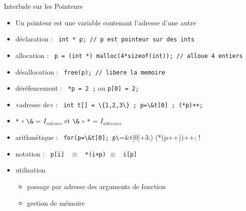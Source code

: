 \documentclass[11pt,mathserif]{beamer}
\newcommand{\scout}{\faAngellist}
\newcommand{\argi}{\faLightbulbO}
\newif\ifC
\begin{document}
\ifC
\begin{frame}{Interlude sur les Pointeurs}
\begin{itemize}[<+->]
  \item Un pointeur est une variable contenant l'adresse d'une autre
  \item déclaration : \lstinline! int * p; // p est pointeur sur des ints !
  \item allocation  : \lstinline! p = (int *) malloc(4*sizeof(int)); // alloue 4 entiers !
  \item désallocation : \lstinline! free(p); // libere la memoire !
  \item déréfencement : \lstinline! *p = 2 ;! ou \lstinline !p[0] = 2;!
  \item «adresse de» : \lstinline! int t[] = \{1,2,3\} ; p=\&t[0] ; (*p)++;!
  \item[\argi] \lstinline!*! $\circ$ \lstinline!\&! = $I_{valeurs}$ et \lstinline!\&! $\circ$ \lstinline!*! = $I_{adresses}$
  \item arithmétique : \lstinline! for(p=\&t[0]; p\!=\&t[0]+3;) (*(p++))++; !
  \item[\scout] notation : \lstinline! p[i] ! $\equiv$ \lstinline! *(i+p)! $\equiv$ \lstinline! i[p]!
  \item utilisation 
    \begin{itemize}
      \item passage par adresse des arguments de fonction
      \item gestion de mémoire
    \end{itemize}
\end{itemize}
\end{frame}
\end{document}
